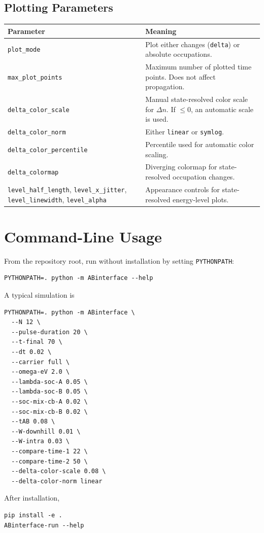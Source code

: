 \documentclass[11pt,a4paper]{article}
\begin{document}
\subsection{Plotting Parameters}

\begin{longtable}{p{}p{}}
\toprule
Parameter & Meaning \\
\midrule
\texttt{plot\_mode} & Plot either changes (\texttt{delta}) or absolute occupations. \\
\texttt{max\_plot\_points} & Maximum number of plotted time points.  Does not affect propagation. \\
\texttt{delta\_color\_scale} & Manual state-resolved color scale for $\Delta n$.  If $\le 0$, an automatic scale is used. \\
\texttt{delta\_color\_norm} & Either \texttt{linear} or \texttt{symlog}. \\
\texttt{delta\_color\_percentile} & Percentile used for automatic color scaling. \\
\texttt{delta\_colormap} & Diverging colormap for state-resolved occupation changes. \\
\texttt{level\_half\_length}, \texttt{level\_x\_jitter}, \texttt{level\_linewidth}, \texttt{level\_alpha} & Appearance controls for state-resolved energy-level plots. \\
\bottomrule
\end{longtable}

\section{Command-Line Usage}

From the repository root, run without installation by setting \texttt{PYTHONPATH}:
\begin{lstlisting}
PYTHONPATH=. python -m ABinterface --help
\end{lstlisting}
A typical simulation is
\begin{lstlisting}
PYTHONPATH=. python -m ABinterface \
  --N 12 \
  --pulse-duration 20 \
  --t-final 70 \
  --dt 0.02 \
  --carrier full \
  --omega-eV 2.0 \
  --lambda-soc-A 0.05 \
  --lambda-soc-B 0.05 \
  --soc-mix-cb-A 0.02 \
  --soc-mix-cb-B 0.02 \
  --tAB 0.08 \
  --W-downhill 0.01 \
  --W-intra 0.03 \
  --compare-time-1 22 \
  --compare-time-2 50 \
  --delta-color-scale 0.08 \
  --delta-color-norm linear
\end{lstlisting}
After installation,
\begin{lstlisting}
pip install -e .
ABinterface-run --help
\end{lstlisting}
\end{document}
